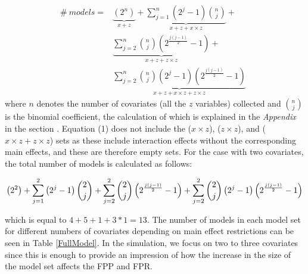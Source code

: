\begin{equation} 
\begin{aligned}
\#\ models={} & \underbrace{\left(2^n\right)}_{x + z}+\underbrace{\sum^n_{j=1}{\left(2^j-1\right)\binom{n}{j}}}_{x + z + x \times z} + \\ 
& \underbrace{\sum^n_{j=2}{\binom{n}{j}\left(2^{\frac{j\left(j-1\right)}{2}}-1\right)}}_{x + z + z \times z} + \\
& \underbrace{\sum^n_{j=2}{\binom{n}{j}\left(2^j-1\right)\left(2^{\frac{j\left(j-1\right)}{2}}-1\right)}}_{x + z + x \times z + z \times z}\ \  
\end{aligned}
\end{equation} 
where $n$ denotes the number of covariates (all the $z$ variables) collected and $\binom{n}{j}$ is the binomial coefficient, the calculation of which is explained in the \textit{Appendix} in the section .
Equation (1) does not include the ($x \times z$), ($z \times z$), and ($x \times z + z \times z$) sets as these include interaction effects without the corresponding main effects, and these are therefore empty sets. For the case with two covariates, the total number of models is calculated as follows:

\begin{equation*}
\centering
\left(2^2\right)+
\sum^2_{j=1}{\left(2^j-1\right) \binom{2}{j}}+
\sum^2_{j=2}{\binom{2}{j}\left(2^{\frac{j\left(j-1\right)}{2}}-1\right)}+  
\sum^2_{j=2}{\binom{2}{j}\left(2^j-1\right)\left(2^{\frac{j\left(j-1\right)}{2}}-1\right)}
\end{equation*}

which is equal to $4+5+1+3*1=13$. The number of models in each model set for different numbers of covariates depending on main effect restrictions can be seen in Table \ref{FullModel}. In the simulation, we focus on two to three covariates since this is enough to provide an impression of how the increase in the size of the model set affects the FPP and FPR.  \\





